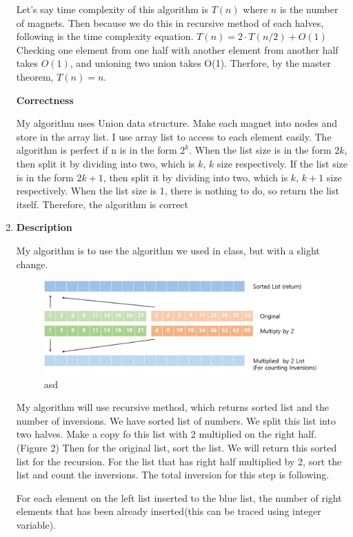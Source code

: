 \documentclass[a4paper,11pt]{article}
\begin{document}
\begin{enumerate}
Let's say time complexity of this algorithm is $T(n)$ where $n$ is the number of magnets.
Then because we do this in recursive method of each halves, following is the time complexity equation.
$T(n) = 2\cdot T(n/2) + O(1)$
Checking one element from one half with another element from another half takes $O(1)$, and unioning two union takes O(1).
Therfore, by the master theorem, $T(n)=n$.

{\bf Correctness}

My algorithm uses Union data structure. Make each magnet into nodes and store in the array list. I use array list to access to each element easily.
The algorithm is perfect if n is in the form $2^k$. 
When the list size is in the form $2k$, then split it by dividing into two, which is $k$, $k$ size respectively.
If the list size is in the form $2k+1$, then split it by dividing into two, which is $k$, $k+1$ size respectively.
When the list size is 1, there is nothing to do, so return the list itself.
Therefore, the algorithm is correct

\item 

{\bf Description}

My algorithm is to use the algorithm we used in class, but with a slight change.
\begin{figure}[hbt]
	\centering
	\includegraphics[scale=0.5]{figure2.png}
	\caption{asd}
\end{figure}

My algorithm will use recursive method, which returns sorted list and the number of inversions. 
We have sorted list of numbers.
We split this list into two halves.
Make a copy fo this list with 2 multiplied on the right half.(Figure 2)
Then for the original list, sort the list. 
We will return this sorted list for the recursion.
For the list that has right half multiplied by 2, sort the list and count the inversions.
The total inversion for this step is following.

For each element on the left list inserted to the blue list, the number of right elements that has been already inserted(this can be traced using integer variable).


\end{enumerate}
\end{document}
